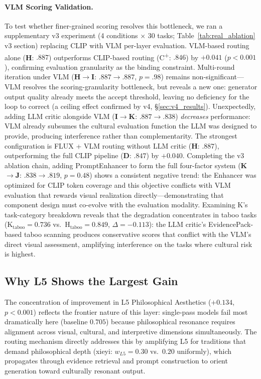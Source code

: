 \documentclass[sigconf, screen, review, anonymous]{acmart}
\newcommand{\Lx}[1]{L#1}
\begin{document}
\paragraph{VLM Scoring Validation.}
To test whether finer-grained scoring resolves this bottleneck, we ran a supplementary v3 experiment (4 conditions $\times$ 30 tasks; Table~\ref{tab:real_ablation} v3 section) replacing CLIP with VLM per-layer evaluation.
VLM-based routing alone (\textbf{H}: $.887$) outperforms CLIP-based routing (C\textsuperscript{+}: $.846$) by $+0.041$ ($p < 0.001$), confirming evaluation granularity as the binding constraint.
Multi-round iteration under VLM (\textbf{H}$\to$\textbf{I}: $.887 \to .887$, $p = .98$) remains non-significant---VLM resolves the scoring-granularity bottleneck, but reveals a new one: generator output quality already meets the accept threshold, leaving no deficiency for the loop to correct (a ceiling effect confirmed by v4, \S\ref{sec:v4_results}).
Unexpectedly, adding LLM critic alongside VLM (\textbf{I}$\to$\textbf{K}: $.887 \to .838$) \emph{decreases} performance: VLM already subsumes the cultural evaluation function the LLM was designed to provide, producing interference rather than complementarity.
The strongest configuration is FLUX + VLM routing without LLM critic (\textbf{H}: $.887$), outperforming the full CLIP pipeline (\textbf{D}: $.847$) by $+0.040$.
Completing the v3 ablation chain, adding PromptEnhancer to form the full four-factor system (\textbf{K}$\to$\textbf{J}: $.838 \to .819$, $p = 0.48$) shows a consistent negative trend: the Enhancer was optimized for CLIP token coverage and this objective conflicts with VLM evaluation that rewards visual realization directly---demonstrating that component design must co-evolve with the evaluation modality.
Examining K's task-category breakdown reveals that the degradation concentrates in taboo tasks ($\text{K}_{\text{taboo}} = 0.736$ vs.\ $\text{H}_{\text{taboo}} = 0.849$, $\Delta = {-}0.113$): the LLM critic's EvidencePack-based taboo scanning produces conservative scores that conflict with the VLM's direct visual assessment, amplifying interference on the tasks where cultural risk is highest.

\subsection{Why L5 Shows the Largest Gain}

The concentration of improvement in \Lx{5} Philosophical Aesthetics ($+0.134$, $p < 0.001$) reflects the frontier nature of this layer: single-pass models fail most dramatically here (baseline $0.705$) because philosophical resonance requires alignment across visual, cultural, and interpretive dimensions simultaneously.
The routing mechanism directly addresses this by amplifying \Lx{5} for traditions that demand philosophical depth (xieyi: $w_{\Lx{5}} = 0.30$ vs.\ $0.20$ uniformly), which propagates through evidence retrieval and prompt construction to orient generation toward culturally resonant output.
\end{document}
